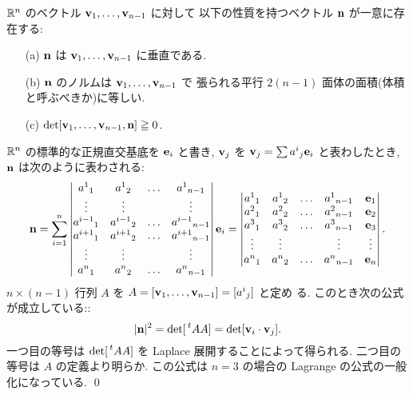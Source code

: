 \documentclass[12pt,twoside]{jarticle}
\begin{document}
\begin{guide}
 ${\mathbb R}^n$ のベクトル ${\mathbf v}_1,\ldots,{\mathbf v}_{n-1}$ に対して
 以下の性質を持つベクトル ${\mathbf n}$ が一意に存在する:
 \begin{itemize}
  \item[(a)] ${\mathbf n}$ は ${\mathbf v}_1,\ldots,{\mathbf v}_{n-1}$ に垂直である.
  \item[(b)] ${\mathbf n}$ のノルムは ${\mathbf v}_1,\ldots,{\mathbf v}_{n-1}$ で
   張られる平行 $2(n-1)$ 面体の面積(体積と呼ぶべきか)に等しい.
  \item[(c)] $\det[{\mathbf v}_1,\ldots,{\mathbf v}_{n-1},{\mathbf n}] \geqq 0$.
 \end{itemize}
 ${\mathbb R}^n$ の標準的な正規直交基底を ${\mathbf e}_i$ と書き, ${\mathbf v}_j$ を
 ${\mathbf v}_j=\sum a^i{}_j{\mathbf e}_i$ と表わしたとき, 
 ${\mathbf n}$ は次のように表わされる:
 \begin{equation*}
  {\mathbf n} = 
  \sum_{i=1}^n
  \begin{vmatrix}
   a^1{}_1     & a^1{}_2     & \ldots & a^1{}_{n-1} \\
   \vdots      & \vdots      &        & \vdots \\
   a^{i-1}{}_1 & a^{i-1}{}_2 & \ldots & a^{i-1}{}_{n-1} \\
   a^{i+1}{}_1 & a^{i+1}{}_2 & \ldots & a^{i+1}{}_{n-1} \\
   \vdots      & \vdots      &        & \vdots \\
   a^n{}_1     & a^n{}_2     & \ldots & a^n{}_{n-1} \\
  \end{vmatrix}
  {\mathbf e}_i
  =
  \begin{vmatrix}
   a^1{}_1 & a^1{}_2 & \ldots & a^1{}_{n-1} & {\mathbf e}_1 \\
   a^2{}_1 & a^2{}_2 & \ldots & a^2{}_{n-1} & {\mathbf e}_2 \\
   a^3{}_1 & a^3{}_2 & \ldots & a^3{}_{n-1} & {\mathbf e}_3 \\
   \vdots  & \vdots  &        & \vdots      & \vdots \\
   a^n{}_1 & a^n{}_2 & \ldots & a^n{}_{n-1} & {\mathbf e}_n \\
  \end{vmatrix}.
 \end{equation*}
 $n\times(n-1)$ 行列 $A$ を $A=[{\mathbf v}_1,\ldots,{\mathbf v}_{n-1}]=[a^i{}_j]$ と定め
 る. このとき次の公式が成立している::
 \begin{equation*}
  |\n|^2 = \det[\tp{A}A] = \det[\v_i\cdot\v_j].
 \end{equation*}
 一つ目の等号は $\det[\tp{A}A]$ を Laplace 展開することによって得られる.
 二つ目の等号は $A$ の定義より明らか.
 この公式は $n=3$ の場合の Lagrange の公式の一般化になっている. \qed
\end{guide}
\end{document}
